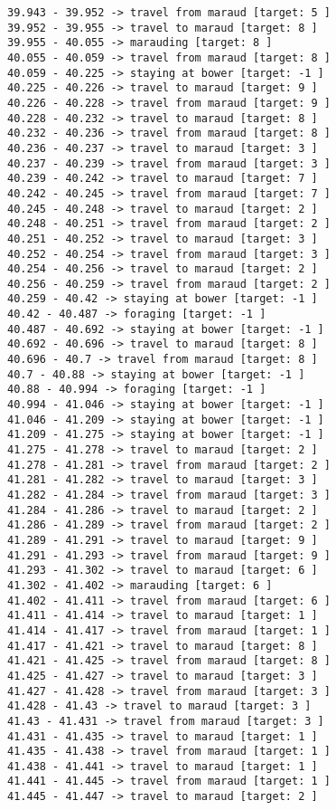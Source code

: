 \documentclass[11pt]{article}
\begin{document}
\begin{Verbatim}[commandchars=\\\{\}]
39.943 - 39.952 -> travel from maraud [target: 5 ]
39.952 - 39.955 -> travel to maraud [target: 8 ]
39.955 - 40.055 -> marauding [target: 8 ]
40.055 - 40.059 -> travel from maraud [target: 8 ]
40.059 - 40.225 -> staying at bower [target: -1 ]
40.225 - 40.226 -> travel to maraud [target: 9 ]
40.226 - 40.228 -> travel from maraud [target: 9 ]
40.228 - 40.232 -> travel to maraud [target: 8 ]
40.232 - 40.236 -> travel from maraud [target: 8 ]
40.236 - 40.237 -> travel to maraud [target: 3 ]
40.237 - 40.239 -> travel from maraud [target: 3 ]
40.239 - 40.242 -> travel to maraud [target: 7 ]
40.242 - 40.245 -> travel from maraud [target: 7 ]
40.245 - 40.248 -> travel to maraud [target: 2 ]
40.248 - 40.251 -> travel from maraud [target: 2 ]
40.251 - 40.252 -> travel to maraud [target: 3 ]
40.252 - 40.254 -> travel from maraud [target: 3 ]
40.254 - 40.256 -> travel to maraud [target: 2 ]
40.256 - 40.259 -> travel from maraud [target: 2 ]
40.259 - 40.42 -> staying at bower [target: -1 ]
40.42 - 40.487 -> foraging [target: -1 ]
40.487 - 40.692 -> staying at bower [target: -1 ]
40.692 - 40.696 -> travel to maraud [target: 8 ]
40.696 - 40.7 -> travel from maraud [target: 8 ]
40.7 - 40.88 -> staying at bower [target: -1 ]
40.88 - 40.994 -> foraging [target: -1 ]
40.994 - 41.046 -> staying at bower [target: -1 ]
41.046 - 41.209 -> staying at bower [target: -1 ]
41.209 - 41.275 -> staying at bower [target: -1 ]
41.275 - 41.278 -> travel to maraud [target: 2 ]
41.278 - 41.281 -> travel from maraud [target: 2 ]
41.281 - 41.282 -> travel to maraud [target: 3 ]
41.282 - 41.284 -> travel from maraud [target: 3 ]
41.284 - 41.286 -> travel to maraud [target: 2 ]
41.286 - 41.289 -> travel from maraud [target: 2 ]
41.289 - 41.291 -> travel to maraud [target: 9 ]
41.291 - 41.293 -> travel from maraud [target: 9 ]
41.293 - 41.302 -> travel to maraud [target: 6 ]
41.302 - 41.402 -> marauding [target: 6 ]
41.402 - 41.411 -> travel from maraud [target: 6 ]
41.411 - 41.414 -> travel to maraud [target: 1 ]
41.414 - 41.417 -> travel from maraud [target: 1 ]
41.417 - 41.421 -> travel to maraud [target: 8 ]
41.421 - 41.425 -> travel from maraud [target: 8 ]
41.425 - 41.427 -> travel to maraud [target: 3 ]
41.427 - 41.428 -> travel from maraud [target: 3 ]
41.428 - 41.43 -> travel to maraud [target: 3 ]
41.43 - 41.431 -> travel from maraud [target: 3 ]
41.431 - 41.435 -> travel to maraud [target: 1 ]
41.435 - 41.438 -> travel from maraud [target: 1 ]
41.438 - 41.441 -> travel to maraud [target: 1 ]
41.441 - 41.445 -> travel from maraud [target: 1 ]
41.445 - 41.447 -> travel to maraud [target: 2 ]

\end{Verbatim}
\end{document}
